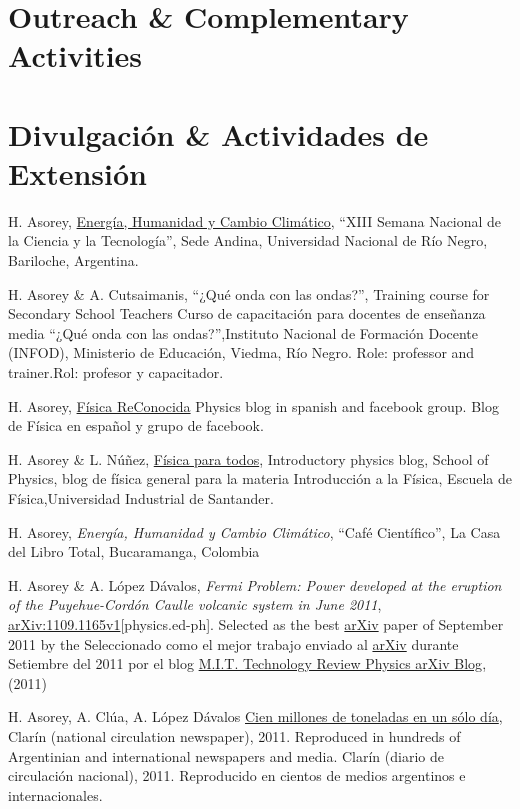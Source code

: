 \ifeng
\section*{Outreach \& Complementary Activities}
\else
\section*{Divulgación \& Actividades de Extensión}
\fi
\noindent

H. Asorey, \href{http://www.semanadelaciencia.mincyt.gob.ar/}{Energía, Humanidad y Cambio Climático}, ``XIII Semana Nacional de la Ciencia y la Tecnología'', Sede Andina, Universidad Nacional de Río Negro, Bariloche, Argentina.

H. Asorey \& A. Cutsaimanis, \ifeng ``¿Qué onda con las ondas?'', Training course for Secondary School Teachers \else Curso de capacitación para docentes de enseñanza media ``¿Qué onda con las ondas?'',\fi Instituto Nacional de Formación Docente (INFOD), Ministerio de Educación, Viedma, Río Negro. \ifeng Role: professor and trainer.\else Rol: profesor y capacitador.\fi

H. Asorey, \href{http://fisicareconocida.blogspot.com}{Física ReConocida} \ifeng Physics blog in spanish and facebook group. \else Blog de Física en español y grupo de facebook.\fi 

 H. Asorey \& L. Núñez, \href{http://halley.uis.edu.co/fisica_para_todos}{Física para todos}, \ifeng Introductory physics blog, School of Physics, \else blog de física general para la materia Introducción a la Física, Escuela de Física,\fi Universidad Industrial de Santander. 

H. Asorey, {\it{Energía, Humanidad y Cambio Climático}}, ``Café Científico'', La Casa del Libro Total, Bucaramanga, Colombia

H. Asorey \& A. López Dávalos, {\emph{Fermi Problem: Power
developed at the eruption of the Puyehue-Cordón Caulle volcanic system in June
2011}}, \href{http://arxiv.org/abs/1109.1165}{arXiv:1109.1165v1}[physics.ed-ph]. \ifeng
Selected as the best \href{http://arxiv.org}{arXiv} paper of September 2011 by the
\else
Seleccionado como el mejor trabajo enviado al \href{http://arxiv.org}{arXiv} durante Setiembre del 2011 por el blog
\fi
\href{http://www.technologyreview.com/blog/arxiv/27140/}{M.I.T. Technology
Review Physics arXiv Blog}, (2011)

H. Asorey, A. Clúa, A. López Dávalos \href{http://www.clarin.com/sociedad/Cien-millones-toneladas-cenizas-solo_0_517148395.html}{Cien millones de toneladas en un sólo día}, 
\ifeng
Clarín (national circulation newspaper), 2011. Reproduced in hundreds of Argentinian and international newspapers and media.
\else
Clarín (diario de circulación nacional), 2011. Reproducido en cientos de medios argentinos e internacionales.
\fi


